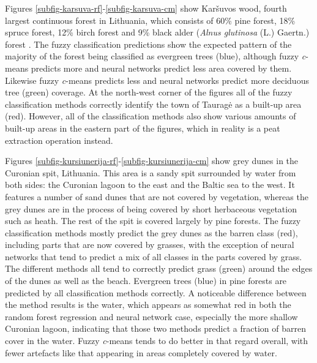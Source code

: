 \documentclass[a4paper,12pt]{scrbook}
\begin{document}
Figures \ref{subfig-karsuva-rf}-\ref{subfig-karsuva-cm} show Kar\v{s}uvos wood, fourth largest continuous forest in Lithuania, which consists of 60\% pine forest, 18\% spruce forest, 12\% birch forest and 9\% black alder (\textit{Alnus glutinosa} (L.) Gaertn.) forest \citep{lietuviuenciklopedija2006}. The fuzzy classification predictions show the expected pattern of the majority of the forest being classified as evergreen trees (blue), although fuzzy \textit{c}-means predicts more and neural networks predict less area covered by them. Likewise fuzzy \textit{c}-means predicts less and neural networks predict more deciduous tree (green) coverage. At the north-west corner of the figures all of the fuzzy classification methods correctly identify the town of Taurag\.{e} as a built-up area (red). However, all of the classification methods also show various amounts of built-up areas in the eastern part of the figures, which in reality is a peat extraction operation instead.

Figures \ref{subfig-kursiunerija-rf}-\ref{subfig-kursiunerija-cm} show grey dunes in the Curonian spit, Lithuania. This area is a sandy spit surrounded by water from both sides: the Curonian lagoon to the east and the Baltic sea to the west. It features a number of sand dunes that are not covered by vegetation, whereas the grey dunes are in the process of being covered by short herbaceous vegetation such as heath. The rest of the spit is covered largely by pine forests. The fuzzy classification methods mostly predict the grey dunes as the barren class (red), including parts that are now covered by grasses, with the exception of neural networks that tend to predict a mix of all classes in the parts covered by grass. The different methods all tend to correctly predict grass (green) around the edges of the dunes as well as the beach. Evergreen trees (blue) in pine forests are predicted by all classification methods correctly. A noticeable difference between the method results is the water, which appears as somewhat red in both the random forest regression and neural network case, especially the more shallow Curonian lagoon, indicating that those two methods predict a fraction of barren cover in the water. Fuzzy \textit{c}-means tends to do better in that regard overall, with fewer artefacts like that appearing in areas completely covered by water.
\end{document}
